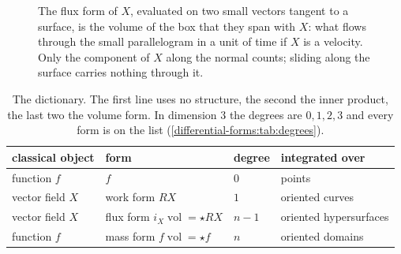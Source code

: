 \begin{notechapter}
\begin{figure}[ht]
\centering
{}
\caption{The flux form of $X$, evaluated on two small vectors tangent
to a surface, is the volume of the box that they span with $X$: what
flows through the small parallelogram in a unit of time if $X$ is a
velocity. Only the component of $X$ along the normal counts; sliding
along the surface carries nothing through it.}
\label{vector-calculus:fig:flux}
\end{figure}

\begin{table}[ht]
\centering
\begin{tabular}{@{}llll@{}}
\toprule
classical object & form & degree & integrated over \\
\midrule
function $f$ & $f$ & $0$ & points \\
vector field $X$ & work form $RX$ & $1$ & oriented curves \\
vector field $X$ & flux form $i_X\operatorname{vol} = \star RX$
  & $n - 1$ & oriented hypersurfaces \\
function $f$ & mass form $f\operatorname{vol} = \star f$ & $n$
  & oriented domains \\
\bottomrule
\end{tabular}
\caption{The dictionary. The first line uses no structure, the second
the inner product, the last two the volume form. In dimension $3$
the degrees are
$0, 1, 2, 3$ and every form is on the list
(\cref{differential-forms:tab:degrees}).}
\label{vector-calculus:tab:dictionary}
\end{table}


\end{notechapter}
